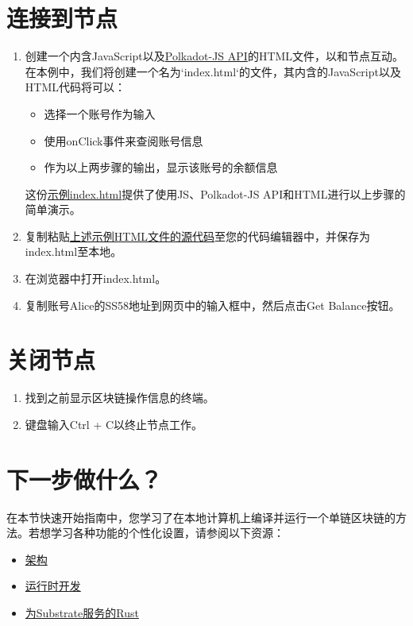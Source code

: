 \section{连接到节点}

\begin{enumerate}
  \item 创建一个内含JavaScript以及\href{https://polkadot.js.org/docs/}{Polkadot-JS API}的HTML文件，以和节点互动。
  在本例中，我们将创建一个名为`index.html`的文件，其内含的JavaScript以及HTML代码将可以：
        \begin{itemize}
          \item 选择一个账号作为输入
          \item 使用onClick事件来查阅账号信息
          \item 作为以上两步骤的输出，显示该账号的余额信息
        \end{itemize}

        这份\href{https://docs.substrate.io/assets/quickstart/}{示例index.html}提供了使用JS、Polkadot-JS
        API和HTML进行以上步骤的简单演示。
  \item 复制粘贴\href{https://github.com/substrate-developer-hub/substrate-docs/blob/main/static/assets/quickstart/index.html}{上述示例HTML文件的源代码}至您的代码编辑器中，并保存为index.html至本地。
  \item 在浏览器中打开index.html。
  \item 复制账号Alice的SS58地址到网页中的输入框中，然后点击Get Balance按钮。
\end{enumerate}

\section{关闭节点}
\begin{enumerate}
  \item 找到之前显示区块链操作信息的终端。
  \item 键盘输入Ctrl + C以终止节点工作。
\end{enumerate}

\section{下一步做什么？}

在本节快速开始指南中，您学习了在本地计算机上编译并运行一个单链区块链的方法。若想学习各种功能的个性化设置，请参阅以下资源：

\begin{itemize}
  \item \href{https://docs.substrate.io/fundamentals/architecture/}{架构}
  \item \href{https://docs.substrate.io/fundamentals/runtime-development/}{运行时开发}
  \item \href{https://docs.substrate.io/fundamentals/rust-basics/}{为Substrate服务的Rust}
\end{itemize}

